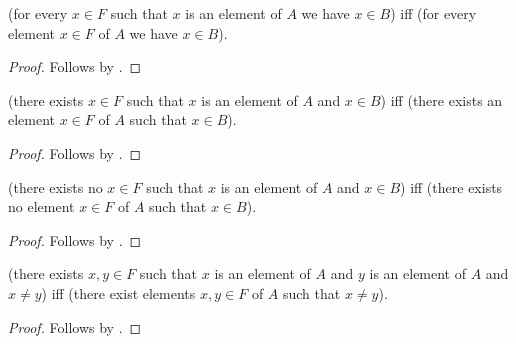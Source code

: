 \begin{proposition}\label{readability_bounded_universal_equivalence}
    (for every $x\in F$ such that $x$ is an element of $A$ we have $x\in B$)
    iff
    (for every element $x\in F$ of $A$ we have $x\in B$).
\end{proposition}
\begin{proof}
    Follows by \auto.
\end{proof}

\begin{proposition}\label{readability_bounded_existential_equivalence}
    (there exists $x\in F$ such that $x$ is an element of $A$ and $x\in B$)
    iff
    (there exists an element $x\in F$ of $A$ such that $x\in B$).
\end{proposition}
\begin{proof}
    Follows by \auto.
\end{proof}

\begin{proposition}\label{readability_bounded_negative_equivalence}
    (there exists no $x\in F$ such that $x$ is an element of $A$ and $x\in B$)
    iff
    (there exists no element $x\in F$ of $A$ such that $x\in B$).
\end{proposition}
\begin{proof}
    Follows by \auto.
\end{proof}

\begin{proposition}\label{readability_bounded_group_equivalence}
    (there exists $x,y\in F$ such that
        $x$ is an element of $A$ and $y$ is an element of $A$ and $x\neq y$)
    iff
    (there exist elements $x,y\in F$ of $A$ such that $x\neq y$).
\end{proposition}
\begin{proof}
    Follows by \auto.
\end{proof}
